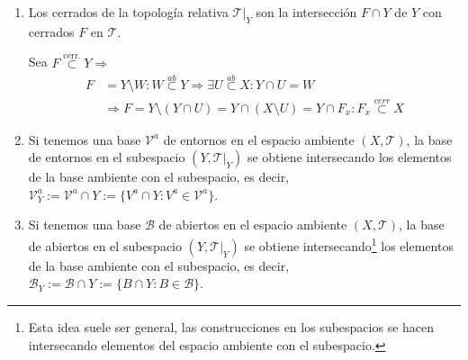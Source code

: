 \begin{obs}
\begin{enumerate}
    \item Los cerrados de la topología relativa $\mathcal{T}|_Y$ son la intersección $F\cap Y$ de $Y$ con cerrados $F$ en $\mathcal{T}$.
    \begin{demo}
    Sea $F \stackrel{\text{cerr.}}{\subset} Y \Rightarrow$
    \begin{align*}
    F &= Y\setminus W : W \stackrel{ab}{\subset} Y \Rightarrow \exists U \stackrel{ab}{\subset}X : Y\cap U = W\\    
    &\Rightarrow F = Y \setminus (Y \cap U) = Y \cap  (X\setminus U) = Y \cap F_x : F_x \stackrel{cerr}{\subset} X
    \end{align*}
    \end{demo}

    \item Si tenemos una base $\mathcal{V}^a$ de entornos en el espacio ambiente $(X,\mathcal{T})$, la base de entornos en el subespacio $(Y,\mathcal{T}|_Y)$ se obtiene intersecando los elementos de la base ambiente con el subespacio, es decir, $\mathcal{V}^a_Y := \mathcal{V}^a \cap Y := \{V^a \cap Y : V^a \in \mathcal{V}^a\}$.

    \item Si tenemos una base $\mathcal{B}$ de abiertos en el espacio ambiente $(X,\mathcal{T})$, la base de abiertos en el subespacio $(Y,\mathcal{T}|_Y)$ se obtiene intersecando\footnote{Esta idea suele ser general, las construcciones en los subespacios se hacen intersecando elementos del espacio ambiente con el subespacio.} los elementos de la base ambiente con el subespacio, es decir, $\mathcal{B}_Y := \mathcal{B} \cap Y := \{B \cap Y : B \in \mathcal{B}\}$.
\end{enumerate}
\end{obs}


